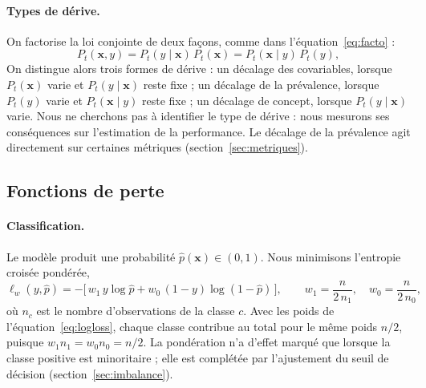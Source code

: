 \documentclass[11pt,a4paper]{article}
\theoremstyle{definition}
\begin{document}
\paragraph{Types de dérive.} On factorise la loi conjointe de deux façons, comme dans l'équation~\eqref{eq:facto} :
\begin{equation}
  P_t(\mathbf{x}, y) = P_t(y \mid \mathbf{x})\, P_t(\mathbf{x}) = P_t(\mathbf{x} \mid y)\, P_t(y),
  \label{eq:facto}
\end{equation}
On distingue alors trois formes de dérive \cite{morenotorres2012unifying,gama2014survey} : un décalage des covariables, lorsque $P_t(\mathbf{x})$ varie et $P_t(y\mid\mathbf{x})$ reste fixe ; un décalage de la prévalence, lorsque $P_t(y)$ varie et $P_t(\mathbf{x}\mid y)$ reste fixe ; un décalage de concept, lorsque $P_t(y\mid\mathbf{x})$ varie. Nous ne cherchons pas à identifier le type de dérive : nous mesurons ses conséquences sur l'estimation de la performance. Le décalage de la prévalence agit directement sur certaines métriques (section~\ref{sec:metriques}).

\subsection{Fonctions de perte}
\label{sec:pertes}

\paragraph{Classification.} Le modèle produit une probabilité $\hat{p}(\mathbf{x}) \in (0,1)$. Nous minimisons l'entropie croisée pondérée,
\begin{equation}
  \ell_w(y, \hat{p}) = -\bigl[\, w_1\, y \log \hat{p} + w_0\, (1-y) \log(1-\hat{p}) \,\bigr],
  \qquad w_1 = \frac{n}{2\,n_1}, \quad w_0 = \frac{n}{2\,n_0},
  \label{eq:logloss}
\end{equation}
où $n_c$ est le nombre d'observations de la classe $c$. Avec les poids de l'équation~\eqref{eq:logloss}, chaque classe contribue au total pour le même poids $n/2$, puisque $w_1 n_1 = w_0 n_0 = n/2$. La pondération n'a d'effet marqué que lorsque la classe positive est minoritaire ; elle est complétée par l'ajustement du seuil de décision (section~\ref{sec:imbalance}).
\end{document}
